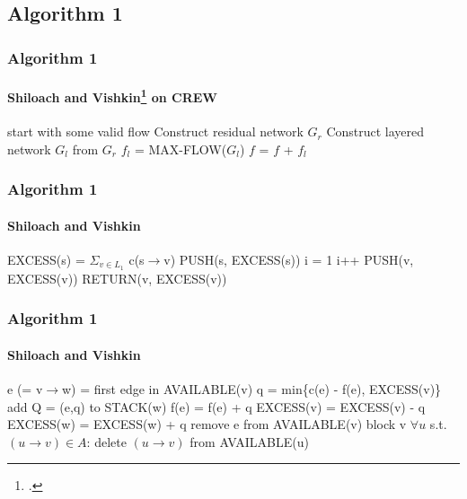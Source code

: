 \documentclass{beamer}
\begin{document}
\subsection{Algorithm 1}
\begin{frame}
\frametitle{Algorithm 1}
\framesubtitle{Shiloach and Vishkin\footcite{yossi81} on CREW} 
	\begin{algorithmic}[1]
	\State start with some valid flow 
	 \Comment{\textcolor{OliveGreen}{$O(\lvert V \rvert)$}}	
		\State Construct residual network $G_r$ \Comment{\textcolor{OliveGreen}{$O(\lvert V \rvert)$, $p=O(\lvert V \rvert)$}}
		\State Construct layered network $G_l$ from $G_r$ 
		\State $f_l$ = MAX-FLOW($G_l$)  
		\State $f$ = $f$ + $f_l$ \Comment{\textcolor{OliveGreen}{$O(\lvert V \rvert)$}}
	\EndWhile
	\EndFunction
	\end{algorithmic}
\end{frame}

\begin{frame}
\frametitle{Algorithm 1}
\framesubtitle{Shiloach and Vishkin} 	
	\begin{algorithmic}[1]
		\State EXCESS(s) = $\Sigma_{v \in L_1}$ c(s$\rightarrow$v)
		\State PUSH(s, EXCESS(s))
		\State i = 1
			\State i++
				\State PUSH(v, EXCESS(v))
			\EndIf
			\State RETURN(v, EXCESS(v))
		\EndWhile
	
	\EndFunction
	\end{algorithmic}
\end{frame}

\begin{frame}[shrink]
\frametitle{Algorithm 1}
\framesubtitle{Shiloach and Vishkin} 
	\begin{algorithmic}[1]
			\State e (= v$\rightarrow$w) = first edge in AVAILABLE(v)
			\State q = min\{c(e) - f(e), EXCESS(v)\}
			\State add Q = (e,q) to STACK(w)
			\State f(e) = f(e) + q
			\State EXCESS(v) = EXCESS(v) - q
			\State EXCESS(w) = EXCESS(w) + q
				\State remove e from AVAILABLE(v)
			\EndIf
		\EndWhile
	 		\State block v
\State $\forall u$ s.t. $(u \rightarrow v) \in A$: delete $(u\rightarrow v)$ from AVAILABLE(u) 
	 	\EndIf
	\EndFunction
	\end{algorithmic}
\end{frame}
\end{document}
